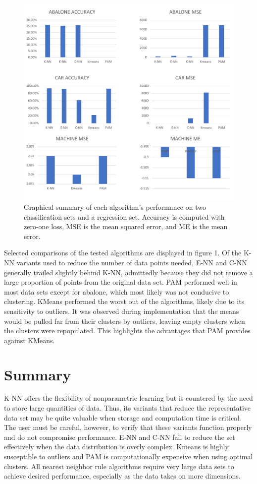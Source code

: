 \documentclass[twoside,11pt]{article}
\begin{document}
\begin{figure}[h]
	\includegraphics[width=\linewidth]{comparisongraphs.pdf}
	\caption{Graphical summary of each algorithm's performance on two classification sets and a regression set. Accuracy is computed with zero-one loss, MSE is the mean squared error, and ME is the mean error.}
	\label{fig:comparealgs}
\end{figure}

Selected comparisons of the tested algorithms are displayed in figure 1. Of the K-NN variants used to reduce the number of data points needed, E-NN and C-NN generally trailed slightly behind K-NN, admittedly because they did not remove a large proportion of points from the original data set. PAM performed well in most data sets except for abalone, which most likely was not conducive to clustering. KMeans performed the worst out of the algorithms, likely due to its sensitivity to outliers. It was observed during implementation that the means would be pulled far from their clusters by outliers, leaving empty clusters when the clusters were repopulated. This highlights the advantages that PAM provides against KMeans.


\section{Summary}

K-NN offers the flexibility of nonparametric learning but is countered by the need to store large quantities of data. Thus, its variants that reduce the representative data set may be quite valuable when storage and computation time is critical. The user must be careful, however, to verify that these variants function properly and do not compromise performance. E-NN and C-NN fail to reduce the set effectively when the data distribution is overly complex. Kmeans is highly susceptible to outliers and PAM is computationally expensive when using optimal clusters. All nearest neighbor rule algorithms require very large data sets to achieve desired performance, especially as the data takes on more dimensions.



\end{document}
